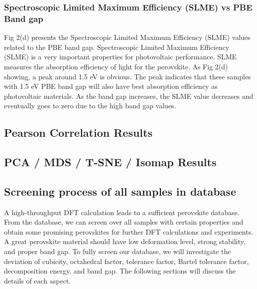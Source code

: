 \documentclass[twoside,twocolumn,9pt]{article}
\begin{document}
    \subsubsection*{Spectroscopic Limited Maximum Efficiency (SLME) vs PBE Band gap}
    Fig 2(d) presents the Spectroscopic Limited Maximum Efficiency (SLME)
    values related to the PBE band gap. Spectroscopic Limited Maximum
    Efficiency (SLME) is a very important properties for photovoltaic
    performance. SLME measures the absorption efficiency of light for the
    perovskite. As Fig 2(d) showing, a peak around 1.5 eV is obvious. The
    peak indicates that these samples with 1.5 eV PBE band gap will also
    have best absorption efficiency as photovoltaic materials. As the band
    gap increases, the SLME value decreases and eventually goes to zero
    due to the high band gap values.
    \subsection*{Pearson Correlation Results}

    \subsection*{PCA / MDS / T-SNE / Isomap Results}

    \subsection*{Screening process of all samples in database}
    A high-throughput DFT calculation leads to a sufficient perovskite
    database. From the database, we can screen over all samples with
    certain properties and obtain some promising perovskites for further
    DFT calculations and experiments. A great perovskite material should
    have low deformation level, strong stability, and proper band gap. To
    fully screen our database, we will investigate the deviation of
    cubicity, octahedral factor, tolerance factor, Bartel tolerance
    factor, decomposition energy, and band gap. The following sections
    will discuss the details of each aspect.
\end{document}
